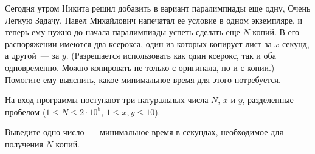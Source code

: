 Сегодня утром Никита решил добавить в вариант паралимпиады еще одну, Очень Легкую
Задачу. Павел Михайлович напечатал ее условие в одном
экземпляре, и теперь ему нужно до начала паралимпиады успеть сделать еще $N$
копий. В его распоряжении имеются два ксерокса, один из которых копирует лист
за $x$ секунд, а другой~--- за $y$. (Разрешается использовать как один ксерокс,
так и оба одновременно. Можно копировать не только с оригинала, но и с копии.)
Помогите ему выяснить, какое минимальное время для этого потребуется.

\InputFile

На вход программы поступают три натуральных числа $N$, $x$ и $y$, разделенные
пробелом ($1 \le N \le 2\cdot 10^{8}$, $1 \le  x, y \le 10$).

\OutputFile

Выведите одно число~--- минимальное время в секундах, необходимое для получения
$N$ копий.

\SAMPLES
